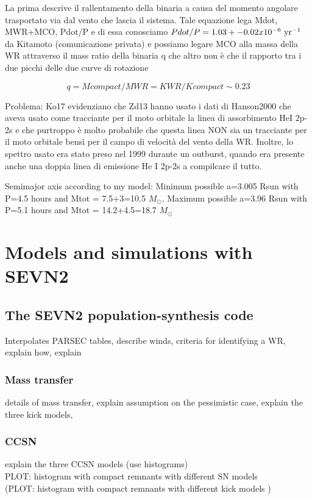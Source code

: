 \documentclass[a4paper,titlepage]{book}     	%
\newcommand{\sun}{\ensuremath{_\odot}}
\newcommand{\msun}{\ensuremath{M\sun}}
\begin{document}
La prima descrive il rallentamento della binaria a causa del momento angolare trasportato via dal vento che lascia il sistema. Tale equazione lega Mdot, MWR+MCO, Pdot/P e di essa conosciamo $Pdot/P = 1.03+- 0.02 x 10^{-6} ~ \rm yr^{-1}$ da Kitamoto (comunicazione privata) e possiamo legare MCO alla massa della WR attraverso il mass ratio della binaria q che altro non è che il rapporto tra i due picchi delle due curve di rotazione

\[q = Mcompact/MWR = KWR / Kcompact \sim 0.23\] 

Problema: Ko17 evidenziano che Zd13 hanno usato i dati di Hanson2000 che aveva usato come tracciante per il moto orbitale la linea di assorbimento HeI 2p-2s e che purtroppo è molto probabile che questa linea NON sia un tracciante per il moto orbitale bensì per il campo di velocità del vento della WR. Inoltre, lo spettro usato era stato preso nel 1999 durante un outburst, quando era presente anche una doppia linea di emissione He I 2p-2s a compilcare il tutto. 




Semimajor axis according to my model: Minimum possible a=3.005 Rsun with P=4.5 hours and Mtot = 7.5+3=10.5 \msun .  Maximum possible a=3.96 Rsun with P=5.1 hours and Mtot = 14.2+4.5=18.7 \msun 


\chapter{Models and simulations with SEVN2}
\section{The SEVN2 population-synthesis code}\label{sec:SEVN}
Interpolates PARSEC tables, describe winds, criteria for identifying a WR, explain how, explain 
\subsection{Mass transfer}\label{subsec:masstransferSEVN}
details of mass transfer, explain assumption on the pessimistic case, explain the three kick models, 
\subsection{CCSN}\label{subsec:SNmodels}
explain the three CCSN models (use histograms)\\
PLOT: histogram with compact remnants with different SN models\\
(PLOT: histogram with compact remnants with different kick models )
\end{document}
